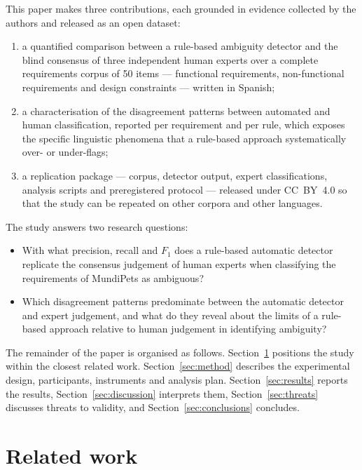 \documentclass[pdflatex,sn-mathphys-num]{sn-jnl}
\theoremstyle{thmstyleone}%
\theoremstyle{thmstyletwo}%
\theoremstyle{thmstylethree}%
\begin{document}
This paper makes three contributions, each grounded in evidence collected by the
authors and released as an open dataset:
\begin{enumerate}
  \item a quantified comparison between a rule-based ambiguity detector and the
        blind consensus of three independent human experts over a complete
        requirements corpus of 50 items --- functional requirements,
        non-functional requirements and design constraints --- written in
        Spanish;
  \item a characterisation of the disagreement patterns between automated and
        human classification, reported per requirement and per rule, which
        exposes the specific linguistic phenomena that a rule-based approach
        systematically over- or under-flags;
  \item a replication package --- corpus, detector output, expert
        classifications, analysis scripts and preregistered protocol ---
        released under CC~BY~4.0 so that the study can be repeated on other
        corpora and other languages.
\end{enumerate}

The study answers two research questions:

\begin{itemize}
  \item[\textbf{RQ1}] With what precision, recall and $F_1$ does a rule-based
        automatic detector replicate the consensus judgement of human experts
        when classifying the requirements of MundiPets as ambiguous?
  \item[\textbf{RQ2}] Which disagreement patterns predominate between the
        automatic detector and expert judgement, and what do they reveal about
        the limits of a rule-based approach relative to human judgement in
        identifying ambiguity?
\end{itemize}

The remainder of the paper is organised as follows. Section~\ref{sec:related}
positions the study within the closest related work. Section~\ref{sec:method}
describes the experimental design, participants, instruments and analysis plan.
Section~\ref{sec:results} reports the results, Section~\ref{sec:discussion}
interprets them, Section~\ref{sec:threats} discusses threats to validity, and
Section~\ref{sec:conclusions} concludes.

\section{Related work}\label{sec:related}
\end{document}

